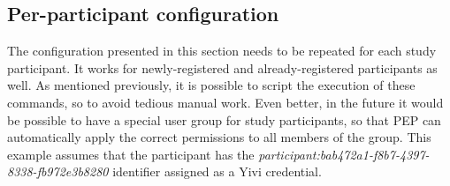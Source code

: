 \documentclass{report}
\begin{document}
\subsection{Per-participant configuration}
The configuration presented in this section needs to be repeated for each study participant. It works for newly-registered and already-registered participants as well. As
mentioned previously, it is possible to script the execution of these commands, so to avoid tedious manual work. Even better, in the future it would be possible to have a special
user group for study participants, so that PEP can automatically apply the correct permissions to all members of the group. This example assumes that the participant has the
\textit{participant:bab472a1-f8b7-4397-8338-fb972e3b8280} identifier assigned as a Yivi credential. 
\end{document}
